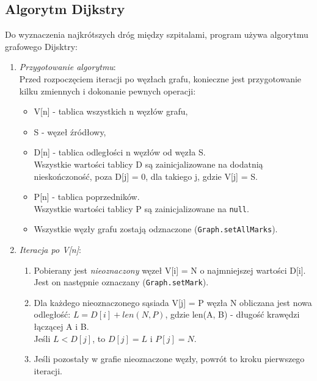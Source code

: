 \documentclass{article}
\begin{document}
\subsection{Algorytm Dijkstry}
\label{algo_dijkstra}
Do wyznaczenia najkrótszych dróg między szpitalami, program używa algorytmu grafowego Dijsktry:

\begin{enumerate}
    \item \emph{Przygotowanie algorytmu}: \\
          Przed rozpoczęciem iteracji po węzłach grafu, konieczne jest przygotowanie kilku zmiennych i dokonanie pewnych operacji:
          \begin{itemize}
                \item V[n] - tablica wszystkich n węzłów grafu,
                \item S - węzeł źródłowy,
                \item D[n] - tablica odległości n węzłów od węzła S. \\
                    Wszystkie wartości tablicy D są zainicjalizowane na dodatnią nieskończoność, poza D[j] = 0, dla takiego j, gdzie V[j] = S.
                \item P[n] - tablica poprzedników. \\
                    Wszystkie wartości tablicy P są zainicjalizowane na \texttt{null}.
                \item Wszystkie węzły grafu zostają odznaczone (\texttt{Graph.setAllMarks}).
          \end{itemize}
    \item \emph{Iteracja po V[n]}:
          \begin{enumerate}
              \item Pobierany jest \emph{nieoznaczony} węzeł V[i] = N o najmniejszej wartości D[i]. Jest on następnie oznaczany (\texttt{Graph.setMark}).
              \item Dla każdego nieoznaczonego sąsiada V[j] = P węzła N obliczana jest nowa odległość: \({L = D[i] + len(N, P)}\), gdzie len(A, B) - długość krawędzi łączącej A i B. \\
                    Jeśli \(L < D[j]\), to \(D[j] = L\) i \(P[j] = N\).
              \item Jeśli pozostały w grafie nieoznaczone węzły, powrót to kroku pierwszego iteracji.
          \end{enumerate}
\end{enumerate}
\end{document}
